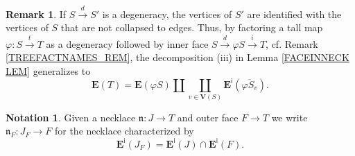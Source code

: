 \documentclass[a4paper,10pt
,draft
]{article}%
\numberwithin{equation}{section}
\numberwithin{figure}{section}
\theoremstyle{definition} %
\newtheorem{remark}[equation]{Remark}%
\newtheorem{notation}[equation]{Notation}%
\newcommand{\1}{\ensuremath{\mathbbm 1}}%
\begin{document}
\begin{remark}
	If $S \xrightarrow{d} S'$
	is a degeneracy,
	the vertices of $S'$ are identified with
	the vertices of $S$ that are not collapsed to edges.
	Thus, by factoring a tall map
	$\varphi \colon S \xrightarrow{t} T$ as
	a degeneracy followed by inner face
	$S \xrightarrow{d} \varphi S \xrightarrow{i} T$,
	cf. Remark \ref{TREEFACTNAMES_REM},
	the decomposition (iii) in Lemma \ref{FACEINNECK LEM}
	generalizes to 
\begin{equation}\label{EDGEBREAK EQ}
	\boldsymbol{E}(T) = 
	\boldsymbol{E}(\varphi S) \amalg 
	\coprod_{v \in \boldsymbol{V}(S)}
	\boldsymbol{E}^{\mathsf{i}}(\overline{\varphi S_v}).
\end{equation}
\end{remark}



\begin{notation}\label{JFNOT NOT}
	Given a necklace
	$\mathfrak{n} \colon J \to T$
	and outer face $F \to T$
	we write 
	$\mathfrak{n}_F \colon J_F \to F$
	for the necklace characterized by
\[
	\boldsymbol{E}^{\mathsf{i}}(J_F)
	=
	\boldsymbol{E}^{\mathsf{i}}(J)
	\cap
	\boldsymbol{E}^{\mathsf{i}}(F).
\]
\end{notation}
\end{document}
